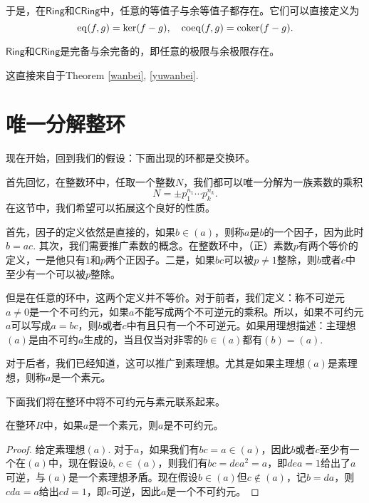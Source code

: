 于是，在$\mathsf{Ring}$和$\mathsf{CRing}$中，任意的等值子与余等值子都存在。它们可以直接定义为
\[
	\operatorname{eq}(f,g)=\ker(f-g),\quad \operatorname{coeq}(f,g)=\operatorname{coker}(f-g).
\]

\begin{thm}
$\mathsf{Ring}$和$\mathsf{CRing}$是完备与余完备的，即任意的极限与余极限存在。
\end{thm}

这直接来自于Theorem \ref{wanbei}, \ref{yuwanbei}.

\section{唯一分解整环}

现在开始，回到我们的假设：下面出现的环都是交换环。

\begin{para}
首先回忆，在整数环中，任取一个整数$N$，我们都可以唯一分解为一族素数的乘积
\[
	N=\pm p_1^{n_1}\cdots p_k^{n_k}.
\]
在这节中，我们希望可以拓展这个良好的性质。

首先，因子的定义依然是直接的，如果$b\in (a)$，则称$a$是$b$的一个因子，因为此时$b=ac$. 其次，我们需要推广素数的概念。在整数环中，（正）素数$p$有两个等价的定义，一是他只有$1$和$p$两个正因子。二是，如果$bc$可以被$p\neq 1$整除，则$b$或者$c$中至少有一个可以被$p$整除。

但是在任意的环中，这两个定义并不等价。对于前者，我们定义：称不可逆元$a\neq 0$是一个不可约元，如果$a$不能写成两个不可逆元的乘积。所以，如果不可约元$a$可以写成$a=bc$，则$b$或者$c$中有且只有一个不可逆元。如果用理想描述：主理想$(a)$是由不可约$a$生成的，当且仅当对非零的$b\in (a)$都有$(b)=(a)$.

对于后者，我们已经知道，这可以推广到素理想。尤其是如果主理想$(a)$是素理想，则称$a$是一个素元。
\end{para}

下面我们将在整环中将不可约元与素元联系起来。

\begin{lem}
在整环$R$中，如果$a$是一个素元，则$a$是不可约元。
\end{lem}

\begin{proof}
给定素理想$(a)$. 对于$a$，如果我们有$bc=a\in (a)$，因此$b$或者$c$至少有一个在$(a)$中，现在假设$b$, $c\in (a)$，则我们有$bc=dea^2=a$，即$dea=1$给出了$a$可逆，与$(a)$是一个素理想矛盾。现在假设$b\in (a)$但$c\not\in (a)$，记$b=da$，则$cda=a$给出$cd=1$，即$c$可逆，因此$a$是一个不可约元。
\end{proof}

